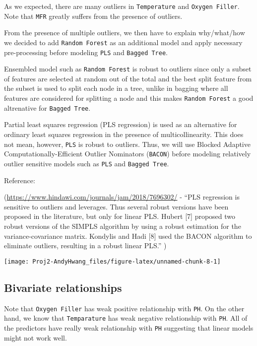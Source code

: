 \documentclass[]{report}
\begin{document}
As we expected, there are many outliers in \texttt{Temperature} and
\texttt{Oxygen\ Filler}. Note that \texttt{MFR} greatly suffers from the
presence of outliers.

From the presence of multiple outliers, we then have to explain
why/what/how we decided to add \texttt{Random\ Forest} as an additional
model and apply necessary pre-processing before modeling \texttt{PLS}
and \texttt{Bagged\ Tree}.

Ensembled model such as \texttt{Random\ Forest} is robust to outliers
since only a subset of features are selected at random out of the total
and the best split feature from the subset is used to split each node in
a tree, unlike in bagging where all features are considered for
splitting a node and this makes \texttt{Random\ Forest} a good
altrenative for \texttt{Bagged\ Tree}.

Partial least squares regression (PLS regression) is used as an
alternative for ordinary least squares regression in the presence of
multicollinearity. This does not mean, however, \texttt{PLS} is robust
to outliers. Thus, we will use Blocked Adaptive
Computationally-Efficient Outlier Nominators (\texttt{BACON}) before
modeling relatively outlier sensitive models such as \texttt{PLS} and
\texttt{Bagged\ Tree}.

Reference:

(\url{https://www.hindawi.com/journals/jam/2018/7696302/} - ``PLS
regression is sensitive to outliers and leverages. Thus several robust
versions have been proposed in the literature, but only for linear PLS.
Hubert {[}7{]} proposed two robust versions of the SIMPLS algorithm by
using a robust estimation for the variance-covariance matrix. Kondylis
and Hadi {[}8{]} used the BACON algorithm to eliminate outliers,
resulting in a robust linear PLS.'' )

\begin{center}\texttt{[image: Proj2-AndyHwang\_files/figure-latex/unnamed-chunk-8-1]} \end{center}

\subsection{Bivariate relationships}\label{bivariate-relationships}

Note that \texttt{Oxygen\ Filler} has weak positive relationship with
\texttt{PH}. On the other hand, we know that \texttt{Temparature} has
weak negative relationship with \texttt{PH}. All of the predictors have
really weak relationship with \texttt{PH} suggesting that linear models
might not work well.
\end{document}
